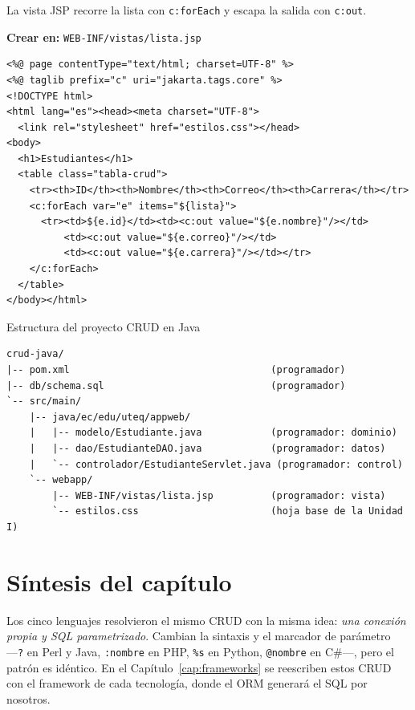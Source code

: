 La vista JSP recorre la lista con \texttt{c:forEach} y escapa la salida
con \texttt{c:out}.

{\small\textbf{Crear en:} \texttt{WEB-INF/vistas/lista.jsp}}
\begin{lstlisting}[style=html,caption={lista.jsp --- vista con JSTL y EL},label={lst:c6-java-jsp}]
<%@ page contentType="text/html; charset=UTF-8" %>
<%@ taglib prefix="c" uri="jakarta.tags.core" %>
<!DOCTYPE html>
<html lang="es"><head><meta charset="UTF-8">
  <link rel="stylesheet" href="estilos.css"></head>
<body>
  <h1>Estudiantes</h1>
  <table class="tabla-crud">
    <tr><th>ID</th><th>Nombre</th><th>Correo</th><th>Carrera</th></tr>
    <c:forEach var="e" items="${lista}">
      <tr><td>${e.id}</td><td><c:out value="${e.nombre}"/></td>
          <td><c:out value="${e.correo}"/></td>
          <td><c:out value="${e.carrera}"/></td></tr>
    </c:forEach>
  </table>
</body></html>
\end{lstlisting}

\begin{cajaejemplo}{Estructura del proyecto CRUD en Java}
\begin{lstlisting}[style=shell,caption={Estructura del CRUD Java web},label={lst:c6-java-tree}]
crud-java/
|-- pom.xml                                   (programador)
|-- db/schema.sql                             (programador)
`-- src/main/
    |-- java/ec/edu/uteq/appweb/
    |   |-- modelo/Estudiante.java            (programador: dominio)
    |   |-- dao/EstudianteDAO.java            (programador: datos)
    |   `-- controlador/EstudianteServlet.java (programador: control)
    `-- webapp/
        |-- WEB-INF/vistas/lista.jsp          (programador: vista)
        `-- estilos.css                       (hoja base de la Unidad I)
\end{lstlisting}
\end{cajaejemplo}

\section{Síntesis del capítulo}
\label{sec:cap6:sintesis}

Los cinco lenguajes resolvieron el mismo CRUD con la misma idea:
\emph{una conexión propia y SQL parametrizado}. Cambian la sintaxis y el
marcador de parámetro ---\texttt{?} en Perl y Java, \texttt{:nombre} en
PHP, \texttt{\%s} en Python, \texttt{@nombre} en C\#---, pero el patrón
es idéntico. En el Capítulo~\ref{cap:frameworks} se reescriben estos
CRUD con el framework de cada tecnología, donde el ORM generará el SQL
por nosotros.
